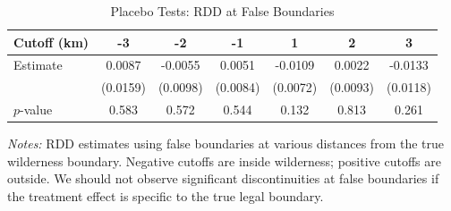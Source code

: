 \begin{table}[t]
\centering
\caption{Placebo Tests: RDD at False Boundaries}
\label{tab:placebo}
\begin{tabular}{lcccccc}
\hline\hline
Cutoff (km) & -3 & -2 & -1 & 1 & 2 & 3 \\
\hline
Estimate & 0.0087 & -0.0055 & 0.0051 & -0.0109 & 0.0022 & -0.0133 \\
 & (0.0159) & (0.0098) & (0.0084) & (0.0072) & (0.0093) & (0.0118) \\
$p$-value & 0.583 & 0.572 & 0.544 & 0.132 & 0.813 & 0.261 \\
\hline\hline
\end{tabular}
\begin{tablenotes}[flushleft]
\small
\item \textit{Notes:} RDD estimates using false boundaries at various distances from the true wilderness boundary. Negative cutoffs are inside wilderness; positive cutoffs are outside. We should not observe significant discontinuities at false boundaries if the treatment effect is specific to the true legal boundary.
\end{tablenotes}
\end{table}
